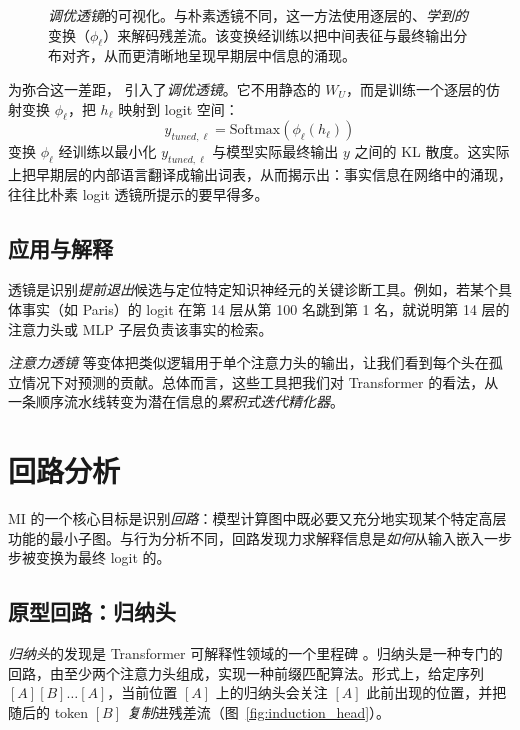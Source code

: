 \begin{figure}[htbp]
    \centering
    \resizebox{0.65\textwidth}{!}{
        
    }
    \caption{\textit{调优透镜}的可视化。与朴素透镜不同，这一方法使用逐层的、\emph{学到的}变换（$\phi_\ell$）来解码残差流。该变换经训练以把中间表征与最终输出分布对齐，从而更清晰地呈现早期层中信息的涌现。}
    \label{fig:tuned_lens}
\end{figure}

为弥合这一差距，\citet{belrose2023eliciting} 引入了\textit{调优透镜}。它不用静态的 $W_U$，而是训练一个逐层的仿射变换 $\phi_\ell$，把 $h_\ell$ 映射到 logit 空间：
\begin{equation}
    y_{tuned, \ell} = \text{Softmax}(\phi_\ell(h_\ell))
\end{equation}
变换 $\phi_\ell$ 经训练以最小化 $y_{tuned, \ell}$ 与模型实际最终输出 $y$ 之间的 KL 散度。这实际上把早期层的内部语言翻译成输出词表，从而揭示出：事实信息在网络中的涌现，往往比朴素 logit 透镜所提示的要早得多。

\subsection{应用与解释}
透镜是识别\emph{提前退出}候选与定位特定知识神经元的关键诊断工具。例如，若某个具体事实（如 Paris）的 logit 在第 14 层从第 100 名跳到第 1 名，就说明第 14 层的注意力头或 MLP 子层负责该事实的检索。

\emph{注意力透镜} \citep{sakarvadia2023attention} 等变体把类似逻辑用于单个注意力头的输出，让我们看到每个头在孤立情况下对预测的贡献。总体而言，这些工具把我们对 Transformer 的看法，从一条顺序流水线转变为潜在信息的\emph{累积式迭代精化器}。



\section{回路分析}

MI 的一个核心目标是识别\emph{回路}：模型计算图中既必要又充分地实现某个特定高层功能的最小子图。与行为分析不同，回路发现力求解释信息是\emph{如何}从输入嵌入一步步被变换为最终 logit 的。

\subsection{原型回路：归纳头}
\emph{归纳头}的发现是 Transformer 可解释性领域的一个里程碑 \citep{olsson2022context}。归纳头是一种专门的回路，由至少两个注意力头组成，实现一种前缀匹配算法。形式上，给定序列 $[A][B] \dots [A]$，当前位置 $[A]$ 上的归纳头会关注 $[A]$ 此前出现的位置，并把随后的 token $[B]$ \emph{复制}进残差流（图~\ref{fig:induction_head}）。

